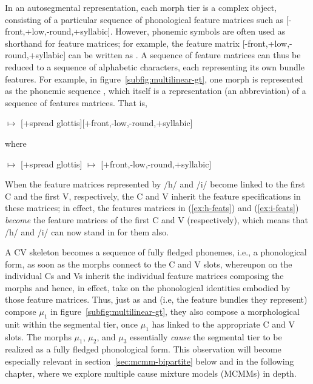 In an autosegmental representation, each morph tier is a complex object, consisting of a particular sequence of phonological feature matrices such as [-front,+low,-round,+syllabic]. However, phonemic symbols are often used as shorthand for
feature matrices; for example, the feature matrix [-front,+low,-round,+syllabic] can
be written as . A sequence of feature matrices can thus be 
reduced to a sequence of alphabetic characters, each representing its own 
bundle features. For example, in figure~\ref{subfig:multilinear-gt}, 
one morph is represented as the phonemic sequence , which itself is a representation (an abbreviation)
of a sequence of features matrices. That is, %
\begin{exe}
\ex {} \quad $\mapsto$ \quad \textipa{/}[+spread glottis][+front,-low,-round,+syllabic]\textipa{/}
\end{exe}
where 
\begin{exe} 
\ex  \label{ex:h-feats}  \quad $\mapsto$ \quad \textipa{/}[+spread glottis]\textipa{/}
\ex  \label{ex:i-feats}  \quad $\mapsto$ \quad \textipa{/}[+front,-low,-round,+syllabic]\textipa{/}
\end{exe}
When the feature matrices represented by /h/ and /i/ become linked to the first 
C and the first V, respectively, the C and V inherit the feature specifications in these matrices; in effect,
the features matrices in (\ref{ex:h-feats}) and (\ref{ex:i-feats}) \emph{become} the
feature matrices of the first C and V (respectively),
which means that /h/ and /i/ can now stand in for them also. %

A CV skeleton becomes a sequence of fully fledged phonemes, i.e., a phonological
form, as soon as the morphs connect to the C and V slots, whereupon on the individual Cs and Vs inherit the individual feature matrices composing the morphs and hence, in effect, take on the phonological identities
embodied by those feature matrices.  
Thus, just as  and  (i.e, the feature bundles they represent) compose 
$\mu_1$ in figure~\ref{subfig:multilinear-gt}, they also compose a morphological 
unit within the segmental tier, once $\mu_1$ has linked to the appropriate C and V slots. The morphs $\mu_1$, $\mu_2$, and $\mu_3$ 
essentially \emph{cause} the segmental tier to be realized as a fully fledged 
phonological form. This observation will become especially relevant in 
section~\ref{sec:mcmm-bipartite} below and in the following chapter, where we explore multiple cause mixture models (MCMMs) in depth.

